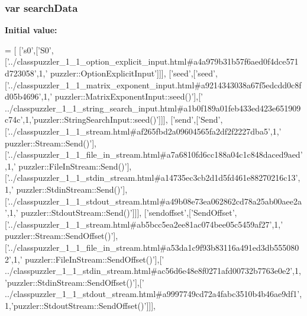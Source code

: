 \subsubsection[{search\+Data}]{\setlength{\rightskip}{0pt plus 5cm}var search\+Data}\label{a00060_ad01a7523f103d6242ef9b0451861231e}
{\bfseries Initial value\+:}
\begin{DoxyCode}
=
[
  [\textcolor{stringliteral}{'s0'},[\textcolor{stringliteral}{'S0'},[\textcolor{stringliteral}{'../classpuzzler\_1\_1\_option\_explicit\_input.html#a4a979b31b57f6aed0f4dce571d723058'},1,\textcolor{stringliteral}{'
      puzzler::OptionExplicitInput'}]]],
  [\textcolor{stringliteral}{'seed'},[\textcolor{stringliteral}{'seed'},[\textcolor{stringliteral}{'../classpuzzler\_1\_1\_matrix\_exponent\_input.html#a9214343038a67f5edcdd0c8fd05b4696'},1,\textcolor{stringliteral}{'
      puzzler::MatrixExponentInput::seed()'}],[\textcolor{stringliteral}{'
      ../classpuzzler\_1\_1\_string\_search\_input.html#a1b0f189a01feb433ed423e651909c74c'},1,\textcolor{stringliteral}{'puzzler::StringSearchInput::seed()'}]]],
  [\textcolor{stringliteral}{'send'},[\textcolor{stringliteral}{'Send'},[\textcolor{stringliteral}{'../classpuzzler\_1\_1\_stream.html#af265fbd2a09604565fa2df2f2227dba5'},1,\textcolor{stringliteral}{'
      puzzler::Stream::Send()'}],[\textcolor{stringliteral}{'../classpuzzler\_1\_1\_file\_in\_stream.html#a7a6810fd6cc188a04c1c848daced9aed'},1,\textcolor{stringliteral}{'
      puzzler::FileInStream::Send()'}],[\textcolor{stringliteral}{'../classpuzzler\_1\_1\_stdin\_stream.html#a14735ec3cb2d1d5fd461e88270216c13'},1,\textcolor{stringliteral}{'
      puzzler::StdinStream::Send()'}],[\textcolor{stringliteral}{'../classpuzzler\_1\_1\_stdout\_stream.html#a49b08e73ea062862cd78a25ab00aee2a'},1,\textcolor{stringliteral}{'
      puzzler::StdoutStream::Send()'}]]],
  [\textcolor{stringliteral}{'sendoffset'},[\textcolor{stringliteral}{'SendOffset'},[\textcolor{stringliteral}{'../classpuzzler\_1\_1\_stream.html#ab5bcc5ea2ee81ac074bee05c5459af27'},1,\textcolor{stringliteral}{'
      puzzler::Stream::SendOffset()'}],[\textcolor{stringliteral}{'../classpuzzler\_1\_1\_file\_in\_stream.html#a53da1c9f93b83116a491ed3db5550802'},1,\textcolor{stringliteral}{'
      puzzler::FileInStream::SendOffset()'}],[\textcolor{stringliteral}{'
      ../classpuzzler\_1\_1\_stdin\_stream.html#ac56d6e48e8f0271afd00732b7763e0e2'},1,\textcolor{stringliteral}{'puzzler::StdinStream::SendOffset()'}],[\textcolor{stringliteral}{'
      ../classpuzzler\_1\_1\_stdout\_stream.html#a9997749cd72a4fabc3510b4b46ae9df1'},1,\textcolor{stringliteral}{'puzzler::StdoutStream::SendOffset()'}]]],

\end{DoxyCode}
